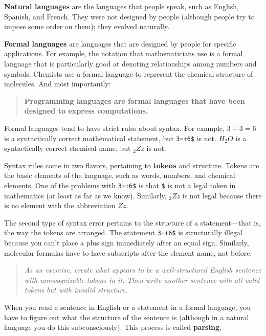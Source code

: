{\bf Natural languages} are the languages that people speak,
such as English, Spanish, and French.  They were not designed
by people (although people try to impose some order on them);
they evolved naturally.

{\bf Formal languages} are languages that are designed by people for
specific applications.  For example, the notation that mathematicians
use is a formal language that is particularly good at denoting
relationships among numbers and symbols.  Chemists use a formal
language to represent the chemical structure of molecules.  And
most importantly:

\begin{quote}
{\bf Programming languages are formal languages that have been
designed to express computations.}
\end{quote}

Formal languages tend to have strict rules about syntax.  For example,
$3+3=6$ is a syntactically correct mathematical statement, but
{\tt 3=+6\$} is not.  $H_2O$ is a syntactically correct chemical name,
but $_2Zz$ is not.

Syntax rules come in two flavors, pertaining to {\bf tokens} and structure.
Tokens are the basic elements of the language, such as words, numbers,
and chemical elements.  One of the problems with {\tt 3=+6\$} is that
{\tt \$} is not a legal token in mathematics (at least as far as we
know).  Similarly, $_2Zz$ is not legal because there is no element with
the abbreviation $Zz$.

The second type of syntax error pertains to the structure of a
statement---that is, the way the tokens are arranged.  The statement
{\tt 3=+6\$} is structurally illegal because you can't place a plus
sign immediately after an equal sign.  Similarly, molecular formulas
have to have subscripts after the element name, not before.

\begin{quote}
{\em As an exercise, create what appears to be a well-structured English
sentence with unrecognizable tokens in it.  Then write another sentence
with all valid tokens but with invalid structure.}
\end{quote}

When you read a sentence in English or a statement in a formal
language, you have to figure out what the structure of the sentence is
(although in a natural language you do this subconsciously).  This
process is called {\bf parsing}.


